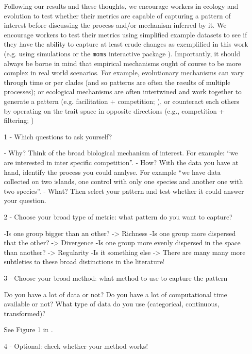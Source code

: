 \documentclass[12pt,letterpaper]{article}
\begin{document}
Following our results and these thoughts, we encourage workers in ecology and evolution to test whether their metrics are capable of capturing a pattern of interest before discussing the process and/or mechanism inferred by it.
We encourage workers to test their metrics using simplified example datasets to see if they have the ability to capture at least crude changes as exemplified in this work (e.g. using simulations \citealt{guillerme2024treats} or the \texttt{moms} interactive package \citealt{guillerme2020shifting}).
Importantly, it should always be borne in mind that empirical mechanisms ought of course to be more complex in real world scenarios.
For example, evolutionary mechanisms can vary through time or per clades (and so patterns are often the results of multiple processes); or ecological mechanisms are often intertwined and work together to generate a pattern (e.g. facilitation + competition; \citealt{danet2024species}), or counteract each others by operating on the trait space in opposite directions (e.g., competition + filtering; \citealt{mammola2024functional})



1 - Which questions to ask yourself?

- Why? Think of the broad biological mechanism of interest. For example: ``we are interested in inter specific competition''.
- How? With the data you have at hand, identify the process you could analyse. For example ``we have data collected on two islands, one control with only one species and another one with two species''.
- What? Then select your pattern and test whether it could answer your question.

2 - Choose your broad type of metric: what pattern do you want to capture?

-Is one group bigger than an other? -> Richness
-Is one group more dispersed that the other? -> Divergence
-Is one group more evenly dispersed in the space than another? -> Regularity 
-Is it something else -> There are many many more subtleties to these broad distinctions in the literature!

3 -  Choose your broad method: what method to use to capture the pattern

Do you have a lot of data or not?
Do you have a lot of computational time available or not?
What type of data do you use (categorical, continuous, transformed)?

See Figure 1 in \cite{mammola2021concepts}.

4 - Optional: check whether your method works!
\end{document}
